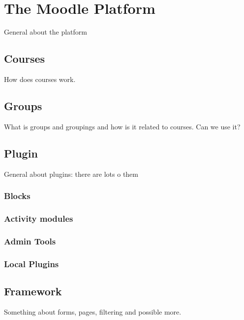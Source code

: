 
\section{The Moodle Platform}
\label{sec:moodleplatform}
	General about the platform






\subsection{Courses}
	How does courses work.






\subsection{Groups}
	What is groups and groupings and how is it related to courses. Can we use it?




\subsection{Plugin}
	General about plugins: there are lots o them 




	\subsubsection{Blocks}





	\subsubsection{Activity modules}





	\subsubsection{Admin Tools}






	\subsubsection{Local Plugins}




\subsection{Framework}
	Something about forms, pages, filtering and possible more.
	
